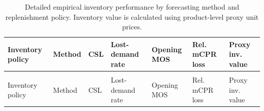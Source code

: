 \documentclass[
  authoryear,
  doubleblind,
  3p]{elsarticle}
\begin{document}
\endgroup{}

\begingroup\fontsize{8}{10}\selectfont

\begin{longtable}{>{\raggedright\arraybackslash}p{7em}>{\raggedright\arraybackslash}p{12em}>{\raggedleft\arraybackslash}p{4.5em}>{\raggedleft\arraybackslash}p{4.5em}>{\raggedleft\arraybackslash}p{4.5em}>{\raggedleft\arraybackslash}p{4.5em}>{\raggedleft\arraybackslash}p{4.5em}}

\caption{\label{tbl-emp-inv-detailed}Detailed empirical inventory
performance by forecasting method and replenishment policy. Inventory
value is calculated using product-level proxy unit prices.}

\tabularnewline

\toprule
Inventory policy & Method & CSL & Lost-demand rate & Opening MOS & Rel. mCPR loss & Proxy inv. value\\
\midrule
\endfirsthead
\multicolumn{7}{@{}l}{\textit{(continued)}}\\
\toprule
Inventory policy & Method & CSL & Lost-demand rate & Opening MOS & Rel. mCPR loss & Proxy inv. value\\
\midrule
\endhead


\end{longtable}
\end{document}
